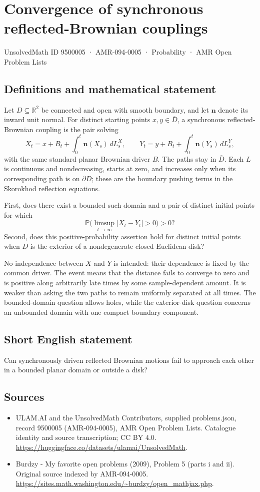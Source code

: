 \documentclass[11pt,a4paper]{article}
\begin{document}
\section*{Convergence of synchronous reflected-Brownian couplings}\label{9500005}
{\small UnsolvedMath ID 9500005 · AMR-094-0005 · Probability · AMR Open Problem Lists}
\subsection{Definitions and mathematical statement}
Let $D\subseteq\mathbb R^2$ be connected and open with smooth boundary, and let $\mathbf n$ denote its inward unit normal. For distinct starting points $x,y\in\overline D$, a synchronous reflected-Brownian coupling is the pair solving
\[
X_t=x+B_t+\int_0^t\mathbf n(X_s)\,dL_s^X,
\qquad
Y_t=y+B_t+\int_0^t\mathbf n(Y_s)\,dL_s^Y,
\]
with the same standard planar Brownian driver $B$. The paths stay in $\overline D$. Each $L$ is continuous and nondecreasing, starts at zero, and increases only when its corresponding path is on $\partial D$; these are the boundary pushing terms in the Skorokhod reflection equations.

First, does there exist a bounded such domain and a pair of distinct initial points for which
\[
\mathbb P\bigl(\limsup_{t\to\infty}|X_t-Y_t|>0\bigr)>0?
\]
Second, does this positive-probability assertion hold for distinct initial points when $D$ is the exterior of a nondegenerate closed Euclidean disk?

No independence between $X$ and $Y$ is intended: their dependence is fixed by the common driver. The event means that the distance fails to converge to zero and is positive along arbitrarily late times by some sample-dependent amount. It is weaker than asking the two paths to remain uniformly separated at all times. The bounded-domain question allows holes, while the exterior-disk question concerns an unbounded domain with one compact boundary component.
\subsection{Short English statement}
Can synchronously driven reflected Brownian motions fail to approach each other in a bounded planar domain or outside a disk?
\subsection{Sources}
\begin{itemize}
\item[S1] ULAM.AI and the UnsolvedMath Contributors, supplied problems.json, record 9500005 (AMR-094-0005), AMR Open Problem Lists. Catalogue identity and source transcription; CC BY 4.0.
\url{https://huggingface.co/datasets/ulamai/UnsolvedMath}.
\item[S2] Burdzy - My favorite open problems (2009), Problem 5 (parts i and ii). Original source indexed by AMR-094-0005.
\url{https://sites.math.washington.edu/~burdzy/open_mathjax.php}.
\end{itemize}
\end{document}

